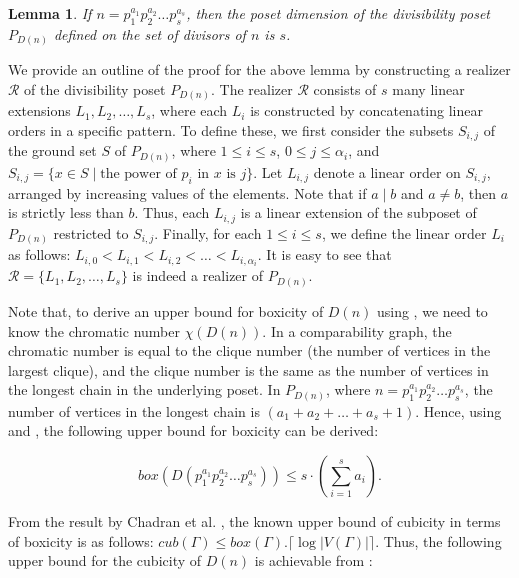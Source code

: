\documentclass[twoside, 11pt]{article}
\newtheorem{lemma}{Lemma}
\newcommand{\G}{\Gamma}
\newcommand{\ceil}[1]{\lceil #1 \rceil}
\begin{document}
\begin{lemma}\cite{lewis2021order}\label{dim of divisibility}
If $n=p_1^{a_1}p_2^{a_2}\dots p_s^{a_s}$, then the poset dimension of the divisibility poset $P_{D(n)}$ defined on the set of divisors of $n$ is $s$.
\end{lemma}

We provide an outline of the proof for the above lemma by constructing a realizer $\mathcal{R}$ of the divisibility poset $P_{D(n)}$. The realizer $\mathcal{R}$ consists of $s$ many linear extensions $L_1,L_2,\dots,L_s$, where each $L_i$ is constructed by concatenating linear orders in a specific pattern. To define these, we first consider the subsets \(S_{i,j}\) of the ground set \(S\) of \(P_{D(n)}\), where \(1 \leq i \leq s\), \(0 \leq j \leq \alpha_i\), and \(S_{i,j} = \{x \in S \mid \text{the power of } p_i \text{ in } x \text{ is } j\}\). Let $L_{i,j}$ denote a linear order on $S_{i,j}$, arranged by increasing values of the elements. Note that if $a \mid b$ and $a \neq b$, then $a$ is strictly less than $b$. Thus, each $L_{i,j}$ is a linear extension of the subposet of $P_{D(n)}$ restricted to $S_{i,j}$. Finally, for each $1 \leq i \leq s$, we define the linear order $L_i$ as follows: $L_{i,0} < L_{i,1} < L_{i,2}< \dots < L_{i,\alpha_i}$. It is easy to see that $\mathcal{R}=\{L_1,L_2,\dots,L_s\}$ is indeed a realizer of $P_{D(n)}$.

 
Note that, to derive an upper bound for boxicity of $D(n)$ using , we need to know the chromatic number $\chi (D(n))$. In a comparability graph, the chromatic number is equal to the clique number (the number of vertices in the largest clique), and the clique number is the same as the number of vertices in the longest chain in the underlying poset. In $P_{D(n)}$, where $n=p_1^{a_1}p_2^{a_2}\dots p_s^{a_s}$, the number of vertices in the longest chain is $(a_1+a_2+\dots+a_s+1)$. Hence, using  and , the following upper bound for boxicity can be derived:
 
 \begin{equation}\label{eq: upper bound from well-known}
     box(D(p_1^{a_1}p_2^{a_2}\dots p_s^{a_s})) \leq s \cdot (\sum_{i=1}^s a_i).
 \end{equation} 
 
 From the result by Chadran et al. \cite{chandran2009upper}, the known upper bound of cubicity in terms of boxicity is as follows: $cub(\G) \leq box(\G).\ceil{\log |V(\G)|}$. Thus, the following upper bound for the cubicity of $D(n)$ is achievable from :
 
\end{document}
